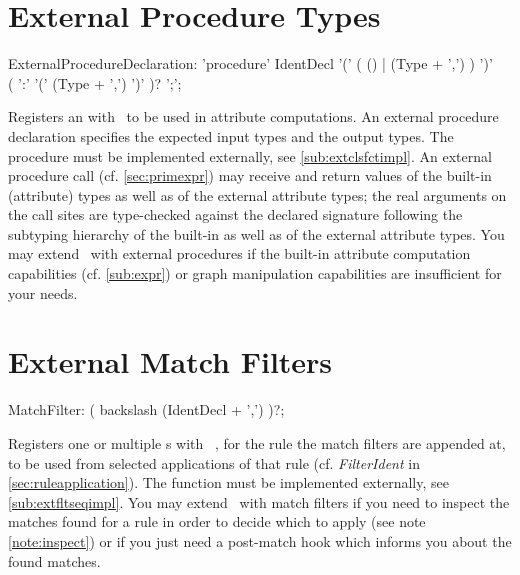 \section{External Procedure Types}\label{sub:extproc}
\begin{rail}
  ExternalProcedureDeclaration: 'procedure' IdentDecl '(' ( () | (Type + ',') ) ')' \\ ( ':' '(' (Type + ',') ')' )? ';';
\end{rail}
Registers an  with \GrG~to be used in attribute computations.
An external procedure declaration specifies the expected input types and the output types. The procedure must be implemented externally, see \ref{sub:extclsfctimpl}.
An external procedure call (cf. \ref{sec:primexpr}) may receive and return values of the built-in (attribute) types as well as of the external attribute types; the real arguments on the call sites are type-checked against the declared signature following the subtyping hierarchy of the built-in as well as of the external attribute types.
You may extend \GrG~with external procedures if the built-in attribute computation capabilities (cf. \ref{sub:expr}) or graph manipulation capabilities are insufficient for your needs.

\section{External Match Filters}\label{sub:extflt}

\begin{rail}
  MatchFilter: ( backslash (IdentDecl + ',') )?;
\end{rail}

Registers one or multiple s with \GrG~, for the rule the match filters are appended at, to be used from selected applications of that rule (cf. \emph{FilterIdent} in \ref{sec:ruleapplication}).
The  function must be implemented externally, see \ref{sub:extfltseqimpl}.
You may extend \GrG~with match filters if you need to inspect the matches found for a rule in order to decide which to apply (see note \ref{note:inspect}) or if you just need a post-match hook which informs you about the found matches.

